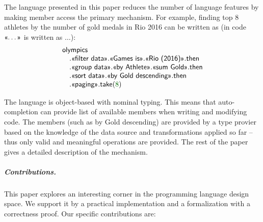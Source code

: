\documentclass[a4paper,UKenglish]{lipics-v2016}
\newcommand{\num}[1]{\textcolor{numclr}{#1}}
\newcommand{\ident}[1]{\textnormal{\sffamily #1}}
\newcommand{\qident}[1]{\textnormal{\sffamily \guillemotleft #1\guillemotright}}
\begin{document}
The language presented in this paper reduces the number of language features by making member access
the primary mechanism. For example, finding top 8 athletes by the number of gold medals in Rio 2016 
can be written as (in code $\qident{\ldots}$ is written as \textquotesingle$\ldots$\textquotesingle):
%
\begin{equation*}
\begin{array}{l}
\ident{olympics}\\
\quad.\qident{filter data}.\qident{Games is}.\qident{Rio (2016)}.\ident{then}\\
\quad.\qident{group data}.\qident{by Athlete}.\qident{sum Gold}.\ident{then}\\
\quad.\qident{sort data}.\qident{by Gold descending}.\ident{then}\\
\quad.\qident{paging}.\ident{take}(\num{8})\\
\end{array}
\end{equation*}

\noindent
The language is object-based with nominal typing. This means that auto-completion can 
provide list of available members when writing and modifying code. The members (such as 
\qident{by Gold descending}) are provided by a type provier based on the knowledge of
the data source and transformations applied so far -- thus only valid and meaningful 
operations are provided. The rest of the paper gives a detailed description of the mechanism.

\subparagraph{Contributions.} This paper explores an interesting corner in the programming
language design space. We support it by a practical implementation and a formalization with
a correctness proof. Our specific contributions are:
\end{document}
